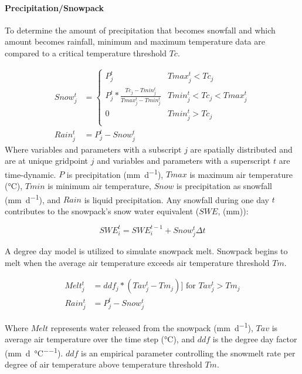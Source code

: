 \paragraph{Precipitation/Snowpack}

To determine the amount of precipitation that becomes snowfall and which amount becomes rainfall, minimum and maximum temperature data are compared to a critical temperature threshold $Tc$.

\begin{align}
Snow_j^t &= \left\{
        \begin{array}{ll}
        P_j^t &  Tmax_j^t < Tc_j \\  
        P_j^t * \frac{Tc_j - Tmin_j^t}{Tmax_j^t - Tmin_j^t} & Tmin_j^t < Tc_j < Tmax_j^t \\
        0 &  Tmin_j^t > Tc_j \\
        \end{array}
\right.\\
Rain_j^t &= P_j^t - Snow_j^t     
\end{align}
\noindent Where variables and parameters with a subscript $j$ are spatially distributed and are at unique gridpoint $j$ and variables and parameters with a superscript $t$ are time-dynamic. $P$ is precipitation (\si{\milli\metre\per\day}), $Tmax$ is maximum air temperature (\si{\degreeCelsius}), $Tmin$ is minimum air temperature, $Snow$ is precipitation as snowfall (\si{\milli\metre\per\day}), and $Rain$ is liquid precipitation. Any snowfall during one day $t$ contributes to the snowpack's snow water equivalent ($SWE$, (\si{\milli\metre})):

\begin{equation}
SWE_i^t = SWE_i^{t-1} + Snow_j^t \Delta t
\end{equation}

A degree day model is utilized to simulate snowpack melt. Snowpack begins to melt when the average air temperature exceeds air temperature threshold $Tm$.

\begin{align}
Melt_j^t &= ddf_j * (Tav_j^t - Tm_j)  ]\text{ for } Tav_j^t > Tm_j \\
Rain_j^t &= P_j^t - Snow_j^t     
\end{align}

\noindent Where $Melt$ represents water released from the snowpack (\si{\milli\metre\per\day}), $Tav$ is average air temperature over the time step (\si{\degreeCelsius}), and $ddf$ is the degree day factor (\si{\milli\metre\per\day\per\degreeCelsius}). $ddf$ is an empirical parameter controlling the snowmelt rate per degree of air temperature above temperature threshold $Tm$. 

